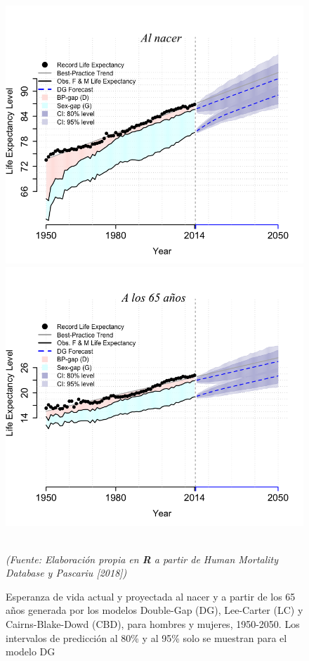 \vspace{-0.3cm}
\begin{figure}[!htp]
\centering
\hspace*{-0.5cm}
\includegraphics[scale=0.35]{Cap2/mortgap01.png}\includegraphics[scale=0.35]{Cap2/mortgap03.png}
\captionsetup{width=0.85\linewidth}
\caption[Esperanza de vida y proyectada con varios modelos]{Esperanza de vida actual y proyectada al nacer y a partir de los 65 años generada por los modelos Double-Gap (DG), Lee-Carter (LC) y Cairns-Blake-Dowd (CBD), para hombres y mujeres, 1950-2050. Los intervalos de predicción al 80\% y al 95\% solo se muestran para el modelo DG }\\
\textit{(Fuente: Elaboración propia en \textbf{R} a partir de Human Mortality Database y Pascariu [2018])}
\end{figure}

